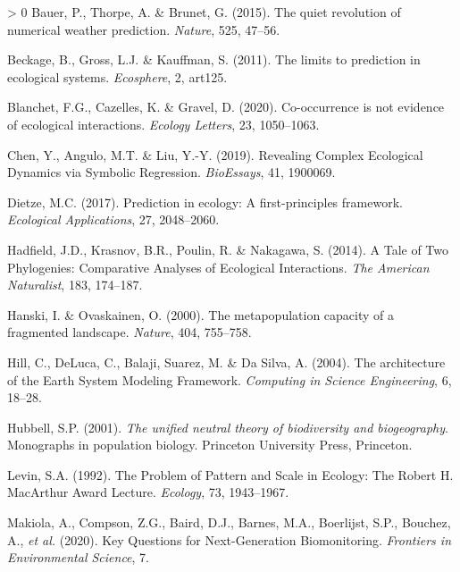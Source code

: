 \documentclass[10pt,oneside]{article}
\newlength{\cslhangindent}
\newenvironment{CSLReferences}[3] %
 {%
  \setlength{\parindent}{0pt}
  \ifodd #1 \everypar{\setlength{\hangindent}{\cslhangindent}}\ignorespaces\fi
  \ifnum #2 > 0
  \setlength{\parskip}{#2\baselineskip}
  \fi
 }%
 {}
\begin{document}
\hypertarget{refs}{}
\begin{CSLReferences}{1}{0}
\leavevmode\hypertarget{ref-Bauer2015QuiRev}{}%
Bauer, P., Thorpe, A. \& Brunet, G. (2015). The quiet revolution of
numerical weather prediction. \emph{Nature}, 525, 47--56.

\leavevmode\hypertarget{ref-Beckage2011LimPre}{}%
Beckage, B., Gross, L.J. \& Kauffman, S. (2011). The limits to
prediction in ecological systems. \emph{Ecosphere}, 2, art125.

\leavevmode\hypertarget{ref-Blanchet2020CooNot}{}%
Blanchet, F.G., Cazelles, K. \& Gravel, D. (2020). Co-occurrence is not
evidence of ecological interactions. \emph{Ecology Letters}, 23,
1050--1063.

\leavevmode\hypertarget{ref-Chen2019RevCom}{}%
Chen, Y., Angulo, M.T. \& Liu, Y.-Y. (2019). Revealing Complex
Ecological Dynamics via Symbolic Regression. \emph{BioEssays}, 41,
1900069.

\leavevmode\hypertarget{ref-Dietze2017PreEco}{}%
Dietze, M.C. (2017). Prediction in ecology: A first-principles
framework. \emph{Ecological Applications}, 27, 2048--2060.

\leavevmode\hypertarget{ref-Hadfield2014TalTwo}{}%
Hadfield, J.D., Krasnov, B.R., Poulin, R. \& Nakagawa, S. (2014). A Tale
of Two Phylogenies: Comparative Analyses of Ecological Interactions.
\emph{The American Naturalist}, 183, 174--187.

\leavevmode\hypertarget{ref-Hanski2000MetCap}{}%
Hanski, I. \& Ovaskainen, O. (2000). The metapopulation capacity of a
fragmented landscape. \emph{Nature}, 404, 755--758.

\leavevmode\hypertarget{ref-Hill2004ArcEar}{}%
Hill, C., DeLuca, C., Balaji, Suarez, M. \& Da Silva, A. (2004). The
architecture of the Earth System Modeling Framework. \emph{Computing in
Science Engineering}, 6, 18--28.

\leavevmode\hypertarget{ref-Hubbell2001UniNeu}{}%
Hubbell, S.P. (2001). \emph{The unified neutral theory of biodiversity
and biogeography}. Monographs in population biology. Princeton
University Press, Princeton.

\leavevmode\hypertarget{ref-Levin1992ProPat}{}%
Levin, S.A. (1992). The Problem of Pattern and Scale in Ecology: The
Robert H. MacArthur Award Lecture. \emph{Ecology}, 73, 1943--1967.

\leavevmode\hypertarget{ref-Makiola2020KeyQue}{}%
Makiola, A., Compson, Z.G., Baird, D.J., Barnes, M.A., Boerlijst, S.P.,
Bouchez, A., \emph{et al.} (2020). Key Questions for Next-Generation
Biomonitoring. \emph{Frontiers in Environmental Science}, 7.


\end{CSLReferences}
\end{document}
